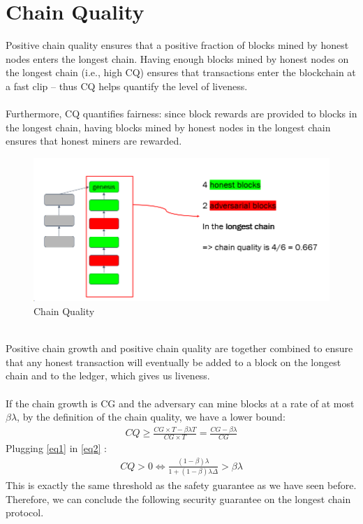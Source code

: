 \section{Chain Quality}
Positive chain quality ensures that a positive fraction of blocks mined by honest nodes enters the longest chain. Having enough blocks mined by honest nodes on the longest chain (i.e., high CQ) ensures that transactions enter the blockchain at a fast clip – thus CQ helps quantify the level of liveness.\\\\
Furthermore, CQ quantifies fairness: since block rewards are provided to blocks in the longest chain, having blocks mined by honest nodes in the longest chain ensures that honest miners are rewarded.
\begin{figure}[h!]
    \centering
    \includegraphics[width=0.7\linewidth]{Fig/07/F2}
    \caption{Chain Quality}
    \label{fig:f2}
\end{figure}\\
Positive chain growth and positive chain quality are together combined to ensure that any honest transaction will
eventually be added to a block on the longest chain and to the ledger, which gives us liveness.\\\\
If the chain growth is CG and the adversary can mine blocks at a rate of at most $\beta\lambda$, by the definition of the chain quality, we have a lower bound:
\begin{align}
    CQ \ge \frac{CG \times T - \beta\lambda T}{CG \times T} = \frac{CG - \beta\lambda}{CG}
    \label{eq2}
\end{align}
Plugging \ref{eq1} in \ref{eq2} :
\begin{align*}
    CQ > 0 \Leftrightarrow \frac{(1-\beta)\lambda}{1+(1-\beta)\lambda\Delta} > \beta\lambda
\end{align*}
This is exactly the same threshold as the safety guarantee as we have seen before. Therefore, we can conclude the following security guarantee on the longest chain protocol.

